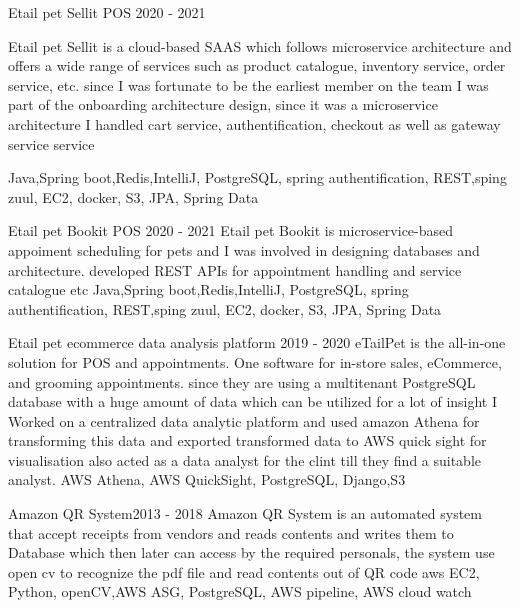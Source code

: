 %
%
%


\begin{projects}
	\project
	{Etail pet Sellit POS }{2020 - 2021}
	{ }
	{

		Etail pet Sellit is a cloud-based SAAS which follows microservice architecture and offers a wide range of services such as product catalogue, inventory service, order service, etc.
		since I was fortunate to be the earliest member on the team I was part of the onboarding architecture design, since it was a microservice architecture I handled cart service, authentification, checkout as well as gateway service service}
	{Java,Spring boot,Redis,IntelliJ, PostgreSQL, spring authentification, REST,sping zuul, EC2, docker, S3, JPA, Spring Data}
				
	\project
	{Etail pet Bookit POS }{2020 - 2021}
	{ }
	{
Etail pet Bookit is microservice-based appoiment scheduling for pets and I was involved in designing databases and architecture. developed REST APIs for appointment handling and service catalogue etc 	}
	{Java,Spring boot,Redis,IntelliJ, PostgreSQL, spring authentification, REST,sping zuul, EC2, docker, S3, JPA, Spring Data}

	\project
	{Etail pet ecommerce data analysis platform }{2019 - 2020}
	{ }
	{
		eTailPet is the all-in-one solution for POS and appointments. One software for in-store sales, eCommerce, and grooming appointments. since they are using a multitenant PostgreSQL database with a huge amount of data which can be utilized for a lot of insight I Worked on a centralized data analytic platform and used amazon Athena for transforming this data and exported transformed data to AWS quick sight for visualisation also acted as a data analyst for the clint till they find a suitable analyst.	}
	{AWS Athena, AWS QuickSight, PostgreSQL, Django,S3}

	\project
	{Amazon QR System}{2013 - 2018}
	{}
	{
		Amazon QR System is an automated system that accept receipts from vendors and reads contents and writes them to Database which then later can access by the required personals, the system use open cv to recognize the pdf file and read contents out of QR code 
		}
	{aws EC2, Python, openCV,AWS ASG, PostgreSQL, AWS pipeline, AWS cloud watch} 


\end{projects}
